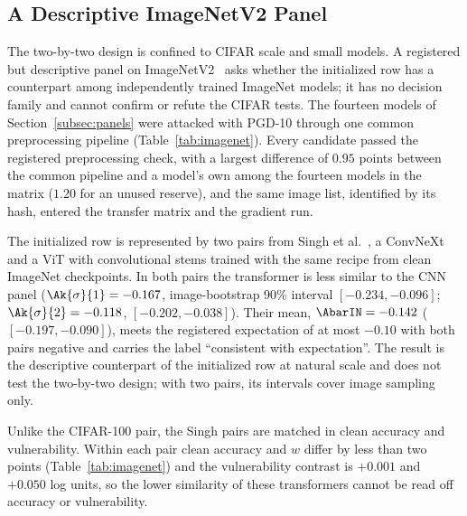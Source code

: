 \subsection{A Descriptive ImageNetV2 Panel}
\label{subsec:imagenet}

The two-by-two design is confined to CIFAR scale and small models. A registered but descriptive panel on ImageNetV2~\cite{recht2019imagenet} asks whether the initialized row has a counterpart among independently trained ImageNet models; it has no decision family and cannot confirm or refute the CIFAR tests. The fourteen models of Section~\ref{subsec:panels} were attacked with PGD-10 through one common preprocessing pipeline (Table~\ref{tab:imagenet}). Every candidate passed the registered preprocessing check, with a largest difference of $0.95$ points between the common pipeline and a model's own among the fourteen models in the matrix ($1.20$ for an unused reserve), and the same image list, identified by its hash, entered the transfer matrix and the gradient run.

The initialized row is represented by two pairs from Singh et al.~\cite{singh2023revisiting}, a ConvNeXt and a ViT with convolutional stems trained with the same recipe from clean ImageNet checkpoints. In both pairs the transformer is less similar to the CNN panel ($\Ak{\sigma}{1} = -0.167$, image-bootstrap 90\% interval $[-0.234, -0.096]$; $\Ak{\sigma}{2} = -0.118$, $[-0.202, -0.038]$). Their mean, $\AbarIN = -0.142$ ($[-0.197, -0.090]$), meets the registered expectation of at most $-0.10$ with both pairs negative and carries the label ``consistent with expectation''. The result is the descriptive counterpart of the initialized row at natural scale and does not test the two-by-two design; with two pairs, its intervals cover image sampling only.

Unlike the CIFAR-100 pair, the Singh pairs are matched in clean accuracy and vulnerability. Within each pair clean accuracy and $w$ differ by less than two points (Table~\ref{tab:imagenet}) and the vulnerability contrast is $+0.001$ and $+0.050$ log units, so the lower similarity of these transformers cannot be read off accuracy or vulnerability.

